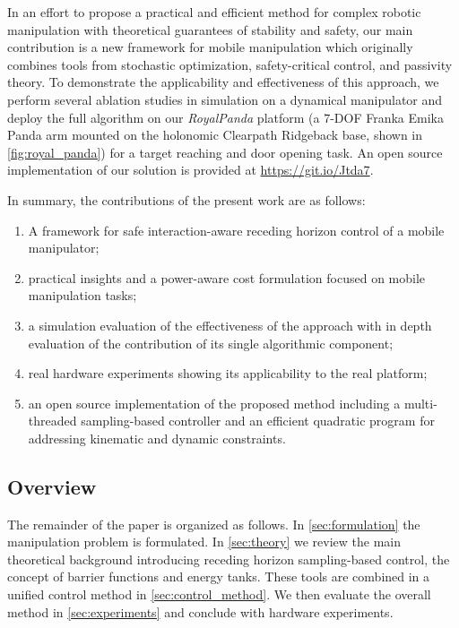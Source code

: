 In an effort to propose a practical and efficient method for complex robotic manipulation with theoretical guarantees of stability and safety, our main contribution is a new framework for mobile manipulation which originally combines tools from stochastic optimization, safety-critical control, and passivity theory.
To demonstrate the applicability and effectiveness of this approach, we perform several ablation studies in simulation on a dynamical manipulator and deploy the full algorithm on our \textit{RoyalPanda} platform (a 7-DOF Franka Emika Panda arm mounted on the holonomic Clearpath Ridgeback base, shown in \fig\ref{fig:royal_panda}) for a target reaching and door opening task. An open source implementation of our solution is provided at \url{https://git.io/Jtda7}.

In summary, the contributions of the present work are as follows:
\begin{enumerate}
    \item A framework for safe interaction-aware receding horizon control of a mobile manipulator;
    \item practical insights and a power-aware cost formulation focused on mobile manipulation tasks;
    \item a simulation evaluation of the effectiveness of the approach with in depth evaluation of the contribution of its single algorithmic component;
    \item real hardware experiments showing its applicability to the real platform;
    \item an open source implementation of the proposed method including a multi-threaded sampling-based controller and an efficient quadratic program for addressing kinematic and dynamic constraints.
    \end{enumerate}

\subsection{Overview}

The remainder of the paper is organized as follows. In 
\sect \ref{sec:formulation} the manipulation problem is formulated. In \sect \ref{sec:theory} we review the main theoretical background introducing receding horizon sampling-based control, the concept of barrier functions and energy tanks. These tools are combined in a unified control method in \sect \ref{sec:control_method}. We then evaluate the overall method in \sect \ref{sec:experiments} and conclude with hardware experiments. 
